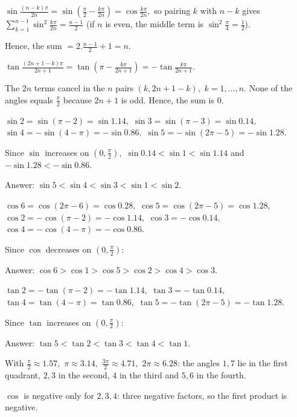   $\sin\frac{(n - k)\pi}{2n} = \sin\left(\frac{\pi}{2} - \frac{k\pi}{2n}\right) = \cos\frac{k\pi}{2n},$ so pairing $k$ with
  $n - k$ gives $\sum_{k = 1}^{n - 1}\sin^2\frac{k\pi}{2n} = \frac{n - 1}{2}$ (if $n$ is even, the middle term is
  $\sin^2\frac{\pi}{4} = \frac{1}{2}$).

  Hence, the sum $= 2.\frac{n - 1}{2} + 1 = n.$

\item $\tan\frac{(2n + 1 - k)\pi}{2n + 1} = \tan\left(\pi - \frac{k\pi}{2n + 1}\right) = -\tan\frac{k\pi}{2n + 1}.$

  The $2n$ terms cancel in the $n$ pairs $(k, 2n + 1 - k),$ $k = 1, \ldots, n.$ None of the angles equals $\frac{\pi}{2}$
  because $2n + 1$ is odd. Hence, the sum is $0.$

\item $\sin 2 = \sin(\pi - 2) = \sin 1.14,$ $\sin 3 = \sin(\pi - 3) = \sin 0.14,$ $\sin 4 = -\sin(4 - \pi) = -\sin 0.86,$ $\sin 5
  = -\sin(2\pi - 5) = -\sin 1.28.$

  Since $\sin$ increases on $\left(0, \frac{\pi}{2}\right),$ $\sin 0.14 < \sin 1 < \sin 1.14$ and $-\sin 1.28 < -\sin 0.86.$

  Answer: $\sin 5 < \sin 4 < \sin 3 < \sin 1 < \sin 2.$

\item $\cos 6 = \cos(2\pi - 6) = \cos 0.28,$ $\cos 5 = \cos(2\pi - 5) = \cos 1.28,$ $\cos 2 = -\cos(\pi - 2) = -\cos 1.14,$
  $\cos 3 = -\cos 0.14,$ $\cos 4 = -\cos(4 - \pi) = -\cos 0.86.$

  Since $\cos$ decreases on $\left(0, \frac{\pi}{2}\right)$:

  Answer: $\cos 6 > \cos 1 > \cos 5 > \cos 2 > \cos 4 > \cos 3.$

\item $\tan 2 = -\tan(\pi - 2) = -\tan 1.14,$ $\tan 3 = -\tan 0.14,$ $\tan 4 = \tan(4 - \pi) = \tan 0.86,$ $\tan 5 = -\tan(2\pi
  - 5) = -\tan 1.28.$

  Since $\tan$ increases on $\left(0, \frac{\pi}{2}\right)$:

  Answer: $\tan 5 < \tan 2 < \tan 3 < \tan 4 < \tan 1.$

\item With $\frac{\pi}{2} \approx 1.57,$ $\pi \approx 3.14,$ $\frac{3\pi}{2} \approx 4.71,$ $2\pi \approx 6.28$: the angles $1,
  7$ lie in the first quadrant, $2, 3$ in the second, $4$ in the third and $5, 6$ in the fourth.

  $\cos$ is negative only for $2, 3, 4$: three negative factors, so the first product is negative.

